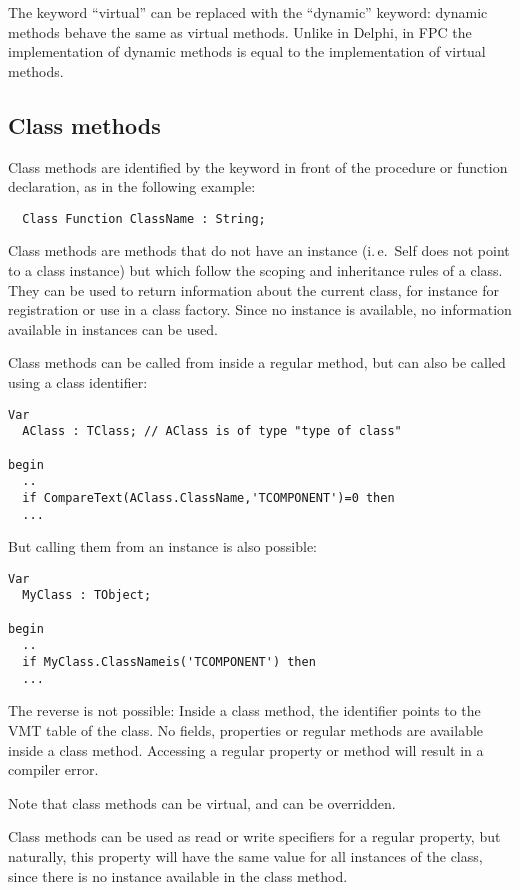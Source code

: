 \begin{remark}
The keyword ``virtual'' can be replaced with the ``dynamic'' keyword: dynamic
methods behave the same as virtual methods. Unlike in Delphi, in FPC the
implementation of dynamic methods is equal to the implementation of virtual
methods.
\end{remark}

\subsection{Class methods}
Class methods are identified by the keyword  in front of the
procedure or function declaration, as in the following example:
\begin{verbatim}
  Class Function ClassName : String;
\end{verbatim}
Class methods are methods that do not have an instance (i.\,e.\ Self does not
point to a class instance) but which follow the scoping and inheritance
rules of a class. They can be used to return information about the current
class, for instance for registration or use in a class factory. Since no
instance is available, no information available in instances can be used.

Class methods can be called from inside a regular method, but can also be called
using a class identifier:
\begin{verbatim}
Var
  AClass : TClass; // AClass is of type "type of class"

begin
  ..
  if CompareText(AClass.ClassName,'TCOMPONENT')=0 then
  ...

\end{verbatim}
But calling them from an instance is also possible:
\begin{verbatim}
Var
  MyClass : TObject;

begin
  ..
  if MyClass.ClassNameis('TCOMPONENT') then
  ...
\end{verbatim}
The reverse is not possible: Inside a class method, the  identifier
points to the VMT table of the class. No fields, properties or
regular methods are available inside a class method. Accessing a regular
property or method will result in a compiler error.

Note that class methods can be virtual, and can be overridden.

Class methods can be used as read or write specifiers for a regular property,
but naturally, this property will have the same value for all instances of the
class, since there is no instance available in the class method.

